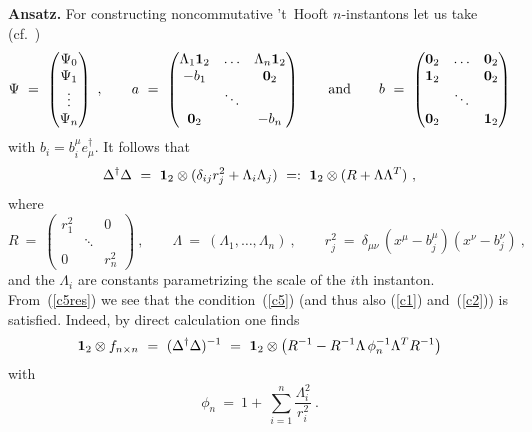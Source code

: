 \documentclass[a4paper,11pt]{article}
\numberwithin{equation}{section}
\def\de{\delta}
\def\La{\Lambda}
\def\+{\dagger}
\begin{document}
{\noindent
{\bf Ansatz.}
For constructing noncommutative 't~Hooft $n$-instantons let us take
(cf.~\cite{Corrigan:1978ce,Osborn:1978rn})
\begin{equation}
\Psi\ =\ \begin{pmatrix}
\Psi_0 \\ \Psi_1 \\ \vdots \\ \Psi_n \end{pmatrix}
\ ,\qquad
a\ =\ \begin{pmatrix}
\La_1{\bf1}_2 & \ldots & \La_n{\bf1}_2 \\
-b_1          &        & {\bf0}_2      \\
              & \ddots &               \\
{\bf0}_2      &        & -b_n          \end{pmatrix}
\qquad\textrm{and}\qquad
b\ =\ \begin{pmatrix}
{\bf0}_2 & \ldots & {\bf0}_2 \\
{\bf1}_2 &        & {\bf0}_2 \\
         & \ddots &          \\
{\bf0}_2 &        & {\bf1}_2 \end{pmatrix}
\end{equation}
with $b_i=b_i^\mu e^\+_\mu$. It follows that
\begin{equation} \label{c5res}
\Delta^\+\Delta\ =\ {\bf1}_2 \otimes (\de_{ij}r_j^2 + \La_i\La_j)\
=:\ {\bf1}_2 \otimes (R + \La\La^T)\ ,
\end{equation}
where
\begin{equation}
R\ =\ \begin{pmatrix}
r_1^2 &        & 0     \\
      & \ddots &       \\
0     &        & r_n^2 \end{pmatrix}\ ,\qquad
\La\ =\ (\La_1,\ldots,\La_n)\ ,\qquad
r_j^2\ =\ \de_{\mu\nu}\,(x^\mu{-}b_j^\mu)(x^\nu{-}b_j^\nu)\ ,
\end{equation}
and the $\La_i$ are constants parametrizing the scale of the $i$th instanton.
{}From~(\ref{c5res}) we see that the condition~(\ref{c5})
(and thus also (\ref{c1}) and~(\ref{c2})) is satisfied.
Indeed, by direct calculation one finds
\begin{equation}
{\bf1}_2\otimes f_{n\times n}\ =\ (\Delta^\+\Delta)^{-1}\ =\
{\bf1}_2\otimes\bigl( R^{-1} - R^{-1}\La\,\phi_n^{-1}\La^T R^{-1} \bigr)
\end{equation}
with
\begin{equation}
\phi_n\ =\ 1+\ \sum_{i=1}^n \frac{\La_i^2}{r_i^2}\ .
\end{equation}

}
\end{document}
